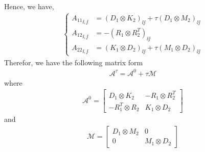 Hence, we have,
\begin{align*}
  \begin{cases}
    {A_{11}}_{\ii, \jj} &= \left( D_1 \otimes K_2 \right)_{\ii \jj} 
                         + \tau \left( D_1 \otimes M_2 \right)_{\ii \jj} 
    \\
    {A_{12}}_{\ii, \jj} &= - \left( R_1 \otimes R_2^T \right)_{\ii \jj} 
    \\
    {A_{22}}_{\ii, \jj} &= \left( K_1 \otimes D_2 \right)_{\ii \jj} 
                         + \tau \left( M_1 \otimes D_2 \right)_{\ii \jj} 
  \end{cases}
\end{align*}
Therefor, we have the following matrix form 
\begin{align}
  \mathcal{A}^\tau = \mathcal{A}^0 + \tau \mathcal{M}
\end{align}
where
\begin{align}
  \mathcal{A}^0 = 
  \begin{bmatrix}
        D_1 \otimes K_2  & - R_1 \otimes R_2^T  \\
    - R_1^T \otimes R_2  &   K_1 \otimes D_2 
  \end{bmatrix}
  \label{eq:matrix-A0-2d}
\end{align}
and
\begin{align}
  \mathcal{M} = 
  \begin{bmatrix}
    D_1 \otimes M_2   & 0  \\
    0 & M_1 \otimes D_2   
  \end{bmatrix}
  \label{eq:matrix-M-2d}
\end{align}

